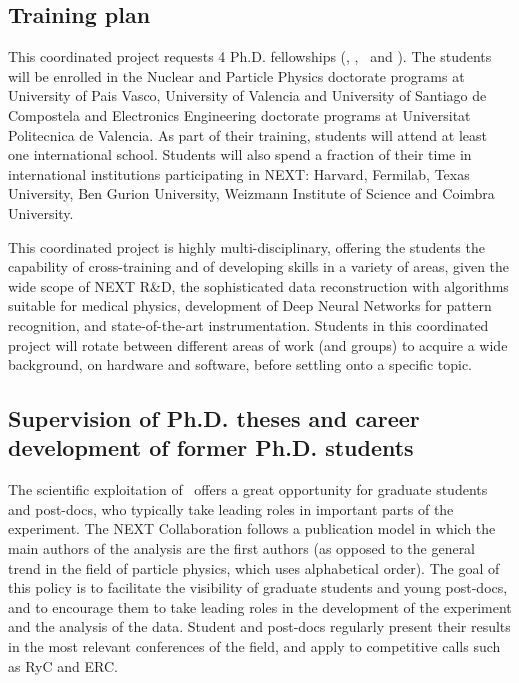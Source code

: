 \subsection{\label{subsubsec:training}Training plan}

\indent 

This coordinated project requests 4 Ph.D. fellowships (\sDIPC, \sIFIC, \sUSC\ and \sUPV). The students will be enrolled in the Nuclear and Particle Physics doctorate programs at University of Pais Vasco, University of Valencia and University of Santiago de Compostela and Electronics Engineering doctorate programs at Universitat Politecnica de Valencia. As part of their training, students will attend at least one international school. Students will also spend a fraction of their time in international institutions participating in NEXT: Harvard, Fermilab, Texas University, Ben Gurion University, Weizmann Institute of Science and Coimbra University.

This coordinated project is highly multi-disciplinary, offering the students the capability of cross-training and of developing skills in a variety of areas, given the wide scope of NEXT R\&D, the sophisticated data reconstruction with algorithms suitable for medical physics, development of Deep Neural Networks for pattern recognition, and state-of-the-art instrumentation. Students in this coordinated project will rotate between different areas of work (and groups) to acquire a wide background, on hardware and software, before settling onto a specific topic.

\subsection{Supervision of Ph.D. theses and career development of former Ph.D. students}

The scientific exploitation of \Next\ offers a great opportunity for graduate students and post-docs, who typically take leading roles in important parts of the experiment. The NEXT Collaboration follows a publication model in which the main authors of the analysis are the first authors (as opposed to the general trend in the field of particle physics, which uses alphabetical order). The goal of this policy is to facilitate the visibility of graduate students and young post-docs, and to encourage them to take leading roles in the development of the experiment and the analysis of the data. Student and post-docs regularly present their results in the most relevant conferences of the field, and apply to competitive calls such as RyC and ERC. 

